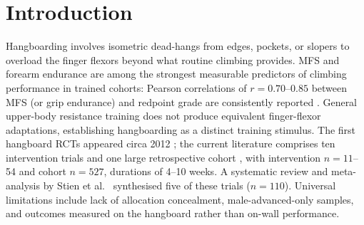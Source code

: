 \section{Introduction}

Hangboarding involves isometric dead-hangs from edges, pockets, or slopers to overload the finger flexors beyond what routine climbing provides. MFS and forearm endurance are among the strongest measurable predictors of climbing performance in trained cohorts: Pearson correlations of $r = 0.70$--$0.85$ between MFS (or grip endurance) and redpoint grade are consistently reported \cite{Wat04, MSB+07, FSS+16}. General upper-body resistance training does not produce equivalent finger-flexor adaptations, establishing hangboarding as a distinct training stimulus. The first hangboard RCTs appeared circa 2012 \cite{LRGB12, MKL15}; the current literature comprises ten intervention trials and one large retrospective cohort \cite{LRGB12, MKL15, LRGB19, LL19, MSA+21, DO22, HO22, DO24, LAS24, RLPCBS25, GKAO24}, with intervention $n = 11$--54 and cohort $n = 527$, durations of 4--10 weeks. A systematic review and meta-analysis by Stien et al.\ \cite{SO23} synthesised five of these trials ($n = 110$). Universal limitations include lack of allocation concealment, male-advanced-only samples, and outcomes measured on the hangboard rather than on-wall performance.
